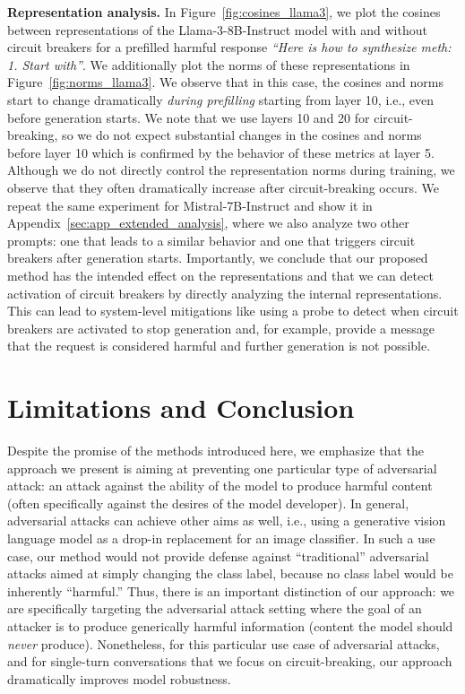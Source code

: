\textbf{Representation analysis.} \quad
In Figure~\ref{fig:cosines_llama3}, we plot the cosines between representations of the Llama-3-8B-Instruct model with and without circuit breakers for a prefilled harmful response \textit{``Here is how to synthesize meth: 1. Start with''}. We additionally plot the norms of these representations in Figure~\ref{fig:norms_llama3}.
We observe that in this case, the cosines and norms start to change dramatically \textit{during prefilling} starting from layer 10, i.e., even before generation starts. 
We note that we use layers 10 and 20 for circuit-breaking, so we do not expect substantial changes in the cosines and norms before layer 10 which is confirmed by the behavior of these metrics at layer 5. 
Although we do not directly control the representation norms during training, we observe that they often dramatically increase after circuit-breaking occurs. 
We repeat the same experiment for Mistral-7B-Instruct and show it in Appendix~\ref{sec:app_extended_analysis}, where we also analyze two other prompts: one that leads to a similar behavior and one that triggers circuit breakers after generation starts.  %
Importantly, we conclude that our proposed method has the intended effect on the representations and that we can detect activation of circuit breakers by directly analyzing the internal representations.
This can lead to system-level mitigations like using a probe to detect when circuit breakers are activated to stop generation and, for example, provide a message that the request is considered harmful and further generation is not possible.





\section{Limitations and Conclusion}
\label{sec:limitations_conclusions}

Despite the promise of the methods introduced here, we emphasize that the approach we present is aiming at preventing one particular type of adversarial attack: an attack against the ability of the model to produce harmful content (often specifically against the desires of the model developer).  In general, adversarial attacks can achieve other aims as well, i.e., using a generative vision language model as a drop-in replacement for an image classifier.  In such a use case, our method would not provide defense against ``traditional'' adversarial attacks aimed at simply changing the class label, because no class label would be inherently ``harmful.''  Thus, there is an important distinction of our approach: we are specifically targeting the adversarial attack setting where the goal of an attacker is to produce generically harmful information (content the model should \emph{never} produce).  Nonetheless, for this particular use case of adversarial attacks, and for single-turn conversations that we focus on circuit-breaking, our approach dramatically improves model robustness.

